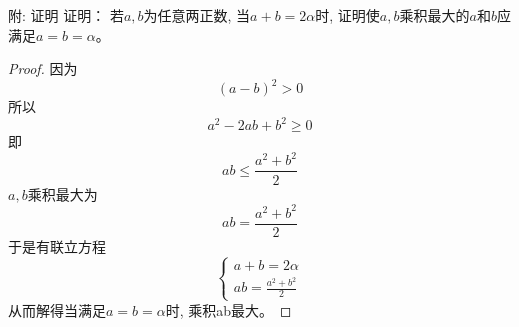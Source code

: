 \begin{frame}[shrink]{附: 证明}
证明： 若$a,b$为任意两正数, 当$a+b=2\alpha$时, 证明使$a,b$乘积最大的$a$和$b$应满足$a=b=\alpha$。
\begin{proof}
	因为
	\[(a-b)^2>0 \]
	所以
	\[a^2-2ab+b^2\ge 0 \]
	即
	\[ab\le\frac{a^2+b^2}{2}\]
	$a, b$乘积最大为
	\[ab=\frac{a^2+b^2}{2}\]
	于是有联立方程
	\[
	\begin{cases}
	a+b=2\alpha\\
	ab=\frac{a^2+b^2}{2}
	\end{cases}
	\]
	从而解得当满足$a=b=\alpha$时, 乘积ab最大。
\end{proof}
\end{frame}


